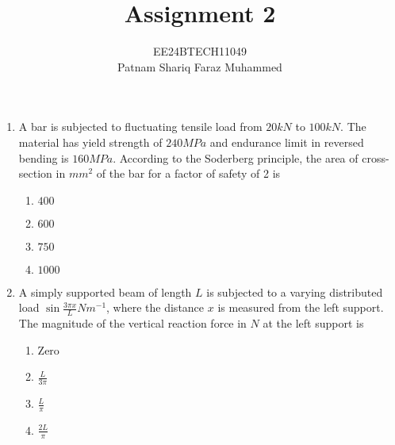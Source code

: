 \documentclass[journal]{IEEEtran}
\numberwithin{equation}{enumi}
\numberwithin{figure}{enumi}
\begin{document}


\title{Assignment 2}
\author{EE24BTECH11049 \\ Patnam Shariq Faraz Muhammed}

{\let\newpage\relax\maketitle}

\begin{enumerate}

    \item 
    A bar is subjected to fluctuating tensile load from $20 kN$ to $100 kN$. The material has yield strength of $240 MPa$ and endurance limit in reversed bending is $160 MPa$. According to the Soderberg principle, the area of cross-section in $mm^2$ of the bar for a factor of safety of 2 is
    \begin{multicols}{4}
        \begin{enumerate}
            \item $400$
            \item $600$
            \item $750$
            \item $1000$
        \end{enumerate}
    \end{multicols}

    \item 
    A simply supported beam of length $L$ is subjected to a varying distributed load $\sin{\frac{3\pi x}{L}} Nm^{-1}$, where the distance $x$ is measured from the left support. The magnitude of the vertical reaction force in $N$ at the left support is

    \begin{multicols}{4}
        \begin{enumerate}
            \item Zero
            \item $\frac{L}{3\pi}$
            \item $\frac{L}{\pi}$
            \item $\frac{2L}{\pi}$
        \end{enumerate}
    \end{multicols}


\end{enumerate}
\end{document}
